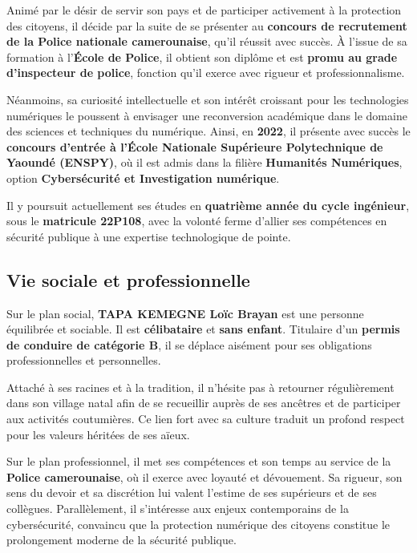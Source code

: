 \documentclass[12pt, a4em]{article}
\begin{document}
	Animé par le désir de servir son pays et de participer activement à la protection des citoyens, il décide par la suite de se présenter au \textbf{concours de recrutement de la Police nationale camerounaise}, qu’il réussit avec succès. 
	À l’issue de sa formation à l’\textbf{École de Police}, il obtient son diplôme et est \textbf{promu au grade d’inspecteur de police}, fonction qu’il exerce avec rigueur et professionnalisme.
	
	Néanmoins, sa curiosité intellectuelle et son intérêt croissant pour les technologies numériques le poussent à envisager une reconversion académique dans le domaine des sciences et techniques du numérique. 
	Ainsi, en \textbf{2022}, il présente avec succès le \textbf{concours d’entrée à l’École Nationale Supérieure Polytechnique de Yaoundé (ENSPY)}, où il est admis dans la filière \textbf{Humanités Numériques}, option \textbf{Cybersécurité et Investigation numérique}. 
	
	Il y poursuit actuellement ses études en \textbf{quatrième année du cycle ingénieur}, sous le \textbf{matricule 22P108}, avec la volonté ferme d’allier ses compétences en sécurité publique à une expertise technologique de pointe.
	
	\subsection{Vie sociale et professionnelle}
	
	Sur le plan social, \textbf{TAPA KEMEGNE Loïc Brayan} est une personne équilibrée et sociable. 
	Il est \textbf{célibataire} et \textbf{sans enfant}. 
	Titulaire d’un \textbf{permis de conduire de catégorie B}, il se déplace aisément pour ses obligations professionnelles et personnelles. 
	
	Attaché à ses racines et à la tradition, il n’hésite pas à retourner régulièrement dans son village natal afin de se recueillir auprès de ses ancêtres et de participer aux activités coutumières. 
	Ce lien fort avec sa culture traduit un profond respect pour les valeurs héritées de ses aïeux.
	
	Sur le plan professionnel, il met ses compétences et son temps au service de la \textbf{Police camerounaise}, où il exerce avec loyauté et dévouement. 
	Sa rigueur, son sens du devoir et sa discrétion lui valent l’estime de ses supérieurs et de ses collègues. 
	Parallèlement, il s’intéresse aux enjeux contemporains de la cybersécurité, convaincu que la protection numérique des citoyens constitue le prolongement moderne de la sécurité publique.
	
\end{document}
